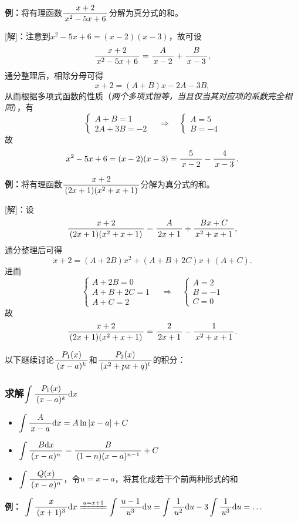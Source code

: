{\bf 例：}将有理函数$\displaystyle\frac{\,{x+2}\,}{\,{x^2-5x+6}\,}$分解为真分式的和。

[解]：注意到$x^2-5x+6=(x-2)(x-3)$，故可设
$$\displaystyle\frac{\,{x+2}\,}{\,{x^2-5x+6}\,}=\displaystyle\frac{\,{A}\,}{\,{x-2}\,}+\displaystyle\frac{\,{B}\,}{\,{x-3}\,},$$
通分整理后，相除分母可得
$$x+2=(A+B)x-2A-3B,$$
从而根据多项式函数的性质（{\it 两个多项式恒等，当且仅当其对应项的系数完全相同}），有
$$
	\left\{\begin{array}{l}
		A+B=1\\
		2A+3B=-2
	\end{array}\right.
	\quad\Rightarrow\quad
	\left\{\begin{array}{l}
		A=5\\
		B=-4
	\end{array}\right.
$$
故
$$x^2-5x+6=(x-2)(x-3)=\displaystyle\frac{\,{5}\,}{\,{x-2}\,}-\displaystyle\frac{\,{4}\,}{\,{x-3}\,}.$$
\fin

{\bf 例：}将有理函数$\displaystyle\frac{\,{x+2}\,}{\,{(2x+1)(x^2+x+1)}\,}$分解为真分式的和。

[解]：设
$$\displaystyle\frac{\,{x+2}\,}{\,{(2x+1)(x^2+x+1)}\,}
=\displaystyle\frac{\,{A}\,}{\,{2x+1}\,}+\displaystyle\frac{\,{Bx+C}\,}{\,{x^2+x+1}\,},$$
通分整理后可得
$$x+2=(A+2B)x^2+(A+B+2C)x+(A+C).$$
进而
$$
	\left\{\begin{array}{l}
		A+2B=0\\
		A+B+2C=1\\
		A+C=2
	\end{array}\right.
	\quad\Rightarrow\quad
	\left\{\begin{array}{l}
		A=2\\
		B=-1\\
		C=0
	\end{array}\right.
$$
故
$$\displaystyle\frac{\,{x+2}\,}{\,{(2x+1)(x^2+x+1)}\,}
=\displaystyle\frac{\,{2}\,}{\,{2x+1}\,}-\displaystyle\frac{\,{1}\,}{\,{x^2+x+1}\,}.$$
\fin

以下继续讨论$\displaystyle\frac{\,{P_1(x)}\,}{\,{(x-a)^k}\,}$和$\displaystyle\frac{\,{P_2(x)}\,}{\,{(x^2+px+q)^l}\,}$的积分：

\subsubsection{求解$\displaystyle\int\displaystyle\frac{\,{P_1(x)}\,}{\,{(x-a)^k}\,}\mathrm{d} x$}

\begin{thx}
	\begin{itemize}
	  \item $\displaystyle\int\displaystyle\frac{\,{A}\,}{\,{x-a}\,}\mathrm{d} x=A\ln|x-a|+C$
	  \item $\displaystyle\int\displaystyle\frac{\,{B\mathrm{d} x}\,}{\,{(x-a)^n}\,}=\displaystyle\frac{\,{B}\,}{\,{(1-n)(x-a)^{n-1}}\,}+C$
	  \item $\displaystyle\int\displaystyle\frac{\,{Q(x)}\,}{\,{(x-a)^n}\,}$，令$u=x-a$，将其化成若干个前两种形式的和
	\end{itemize}
\end{thx}

{\bf 例：}
 $\dint\df x{(x+1)^3}\d x\xlongequal{u=x+1}\dint\df{u-1}{u^3}\d u
 =\dint\df1{u^2}\d u-3\dint\df1{u^3}\d u=\ldots$
 
